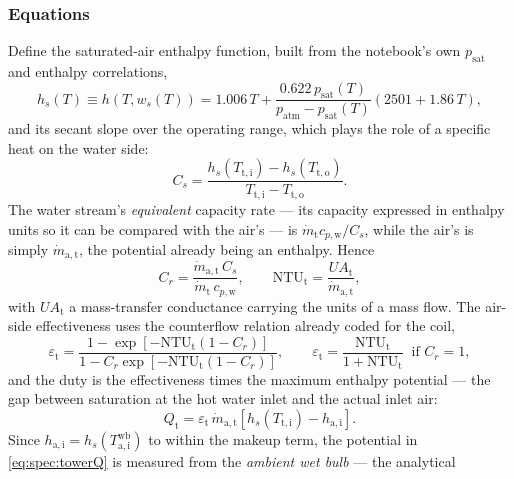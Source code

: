 \documentclass[11pt]{article}
\newcommand{\md}{\ensuremath{\dot m}}
\newcommand{\UA}{\ensuremath{U\!A}}
\newcommand{\patm}{\ensuremath{p_{\mathrm{atm}}}}
\newcommand{\psat}{\ensuremath{p_{\mathrm{sat}}}}
\begin{document}
\subsubsection{Equations}
Define the saturated-air enthalpy function, built from the notebook's own $\psat$ and enthalpy
correlations,
\begin{equation}
h_{s}(T) \equiv h\!\left(T,w_{s}(T)\right)
= 1.006\,T + \frac{0.622\,\psat(T)}{\patm-\psat(T)}\left(2501+1.86\,T\right) ,
\label{eq:spec:hsat}
\end{equation}
and its secant slope over the operating range, which plays the role of a specific heat on the water
side:
\begin{equation}
C_{s} = \frac{h_{s}(T_{\mathrm{t,i}}) - h_{s}(T_{\mathrm{t,o}})}
             {T_{\mathrm{t,i}} - T_{\mathrm{t,o}}} .
\label{eq:spec:Cs}
\end{equation}
The water stream's \emph{equivalent} capacity rate --- its capacity expressed in enthalpy units so it
can be compared with the air's --- is $\md_{\mathrm{t}}c_{p,\mathrm{w}}/C_{s}$, while the air's is
simply $\md_{\mathrm{a,t}}$, the potential already being an enthalpy. Hence
\begin{equation}
C_{r} = \frac{\md_{\mathrm{a,t}}\,C_{s}}{\md_{\mathrm{t}}\,c_{p,\mathrm{w}}} ,
\qquad
\mathrm{NTU}_{\mathrm{t}} = \frac{\UA_{\mathrm{t}}}{\md_{\mathrm{a,t}}} ,
\label{eq:spec:towerNTU}
\end{equation}
with $\UA_{\mathrm{t}}$ a mass-transfer conductance carrying the units of a mass flow. The air-side
effectiveness uses the counterflow relation already coded for the coil,
\begin{equation}
\varepsilon_{\mathrm{t}} =
\frac{1-\exp\!\left[-\mathrm{NTU}_{\mathrm{t}}(1-C_{r})\right]}
     {1-C_{r}\exp\!\left[-\mathrm{NTU}_{\mathrm{t}}(1-C_{r})\right]} ,
\qquad
\varepsilon_{\mathrm{t}} = \frac{\mathrm{NTU}_{\mathrm{t}}}{1+\mathrm{NTU}_{\mathrm{t}}}
\ \text{ if } C_{r}=1 ,
\label{eq:spec:towereps}
\end{equation}
and the duty is the effectiveness times the maximum enthalpy potential --- the gap between saturation
at the hot water inlet and the actual inlet air:
\begin{equation}
Q_{\mathrm{t}} = \varepsilon_{\mathrm{t}}\,\md_{\mathrm{a,t}}
\left[h_{s}(T_{\mathrm{t,i}}) - h_{\mathrm{a,i}}\right] .
\label{eq:spec:towerQ}
\end{equation}
Since $h_{\mathrm{a,i}} = h_{s}(T_{\mathrm{a,i}}^{\mathrm{wb}})$ to within the makeup term, the
potential in \eqref{eq:spec:towerQ} is measured from the \emph{ambient wet bulb} --- the analytical
\end{document}
